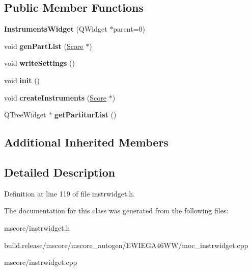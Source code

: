 \subsection*{Public Member Functions}
\begin{DoxyCompactItemize}
\item 
\mbox{\label{class_ms_1_1_instruments_widget_a380a4b8ebdb6e184cc3d2b4bb74e8217}} 
{\bfseries Instruments\+Widget} (Q\+Widget $\ast$parent=0)
\item 
\mbox{\label{class_ms_1_1_instruments_widget_a683d3f853674895e22a109d58a846410}} 
void {\bfseries gen\+Part\+List} (\hyperlink{class_ms_1_1_score}{Score} $\ast$)
\item 
\mbox{\label{class_ms_1_1_instruments_widget_a9825f4b525c955177a7cfebd09cf1215}} 
void {\bfseries write\+Settings} ()
\item 
\mbox{\label{class_ms_1_1_instruments_widget_a88171ea8ff0a7d8a31295029a4bb7824}} 
void {\bfseries init} ()
\item 
\mbox{\label{class_ms_1_1_instruments_widget_ac8f2f7f9530c563c2a1f38b21a4d3cf1}} 
void {\bfseries create\+Instruments} (\hyperlink{class_ms_1_1_score}{Score} $\ast$)
\item 
\mbox{\label{class_ms_1_1_instruments_widget_a08bc9305fb8bb4f2cd96988ca458eb60}} 
Q\+Tree\+Widget $\ast$ {\bfseries get\+Partitur\+List} ()
\end{DoxyCompactItemize}
\subsection*{Additional Inherited Members}


\subsection{Detailed Description}


Definition at line 119 of file instrwidget.\+h.



The documentation for this class was generated from the following files\+:\begin{DoxyCompactItemize}
\item 
mscore/instrwidget.\+h\item 
build.\+release/mscore/mscore\+\_\+autogen/\+E\+W\+I\+E\+G\+A46\+W\+W/moc\+\_\+instrwidget.\+cpp\item 
mscore/instrwidget.\+cpp\end{DoxyCompactItemize}
